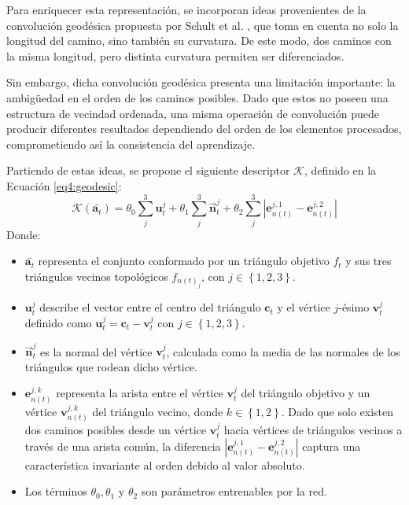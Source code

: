 Para enriquecer esta representación, se incorporan ideas provenientes de la convolución geodésica propuesta por Schult et al. \cite{schult_dualconvmesh-net_2020}, que toma en cuenta no solo la longitud del camino, sino también su curvatura. De este modo, dos caminos con la misma longitud, pero distinta curvatura permiten ser diferenciados.

Sin embargo, dicha convolución geodésica presenta una limitación importante: la ambigüedad en el orden de los caminos posibles. Dado que estos no poseen una estructura de vecindad ordenada, una misma operación de convolución puede producir diferentes resultados dependiendo del orden de los elementos procesados, comprometiendo así la consistencia del aprendizaje.

Partiendo de estas ideas, se propone el siguiente descriptor $\mathcal{K}$, definido en la Ecuación \ref{eq4:geodesic}:
\begin{equation}
\label{eq4:geodesic}
    \mathcal{K}
(\bar{\textbf{a}_{t}}) = \theta_{0} \sum_{j}^{3} \textbf{u}_{t}^{j} + \theta_{1} \sum_{j}^{3}  \overrightarrow{\textbf{n}}_{t}^{j} + \theta_{2} \sum_{j}^{3} |\textbf{e}_{n(t)}^{j,1} - \textbf{e}_{n(t)}^{j,2}|
\end{equation}
Donde: 
\begin{itemize}
    \item $\bar{\textbf{a}_{t}}$ representa el conjunto conformado por un triángulo objetivo $f_{t}$ y sus tres triángulos vecinos topológicos $f_{n(t)_j}$, con $j \in \left\{1,2,3\right\}$.
    \item $\textbf{u}_{t}^{j}$ describe el vector entre el centro del triángulo $\textbf{c}_t$ y el vértice $j$-ésimo $\textbf{v}_{t}^j$ definido como  $\textbf{u}_{t}^{j} = \textbf{c}_t - \textbf{v}_t^j$ con $j \in \left\{1,2,3\right\}$.
    \item $\overrightarrow{\textbf{n}}_{t}^{j}$ es la normal del vértice $\textbf{v}_t^j$, calculada como la media de las normales de los triángulos que rodean dicho vértice.
    \item $\textbf{e}_{n(t)}^{j,k}$ representa la arista entre el vértice $\textbf{v}_{t}^j$ del triángulo objetivo y un vértice $\textbf{v}_{n(t)}^{j,k}$ del triángulo vecino, donde $k \in \left\{1,2\right\}$. Dado que solo existen dos caminos posibles desde un vértice $\textbf{v}_t^j$ hacia vértices de triángulos vecinos a través de una arista común, la diferencia $|\textbf{e}_{n(t)}^{j,1} - \textbf{e}_{n(t)}^{j,2}|$ captura una característica invariante al orden debido al valor absoluto.
    \item Los términos $\theta_0, \theta_1 $ y $\theta_2$ son parámetros entrenables por la red.
\end{itemize}


